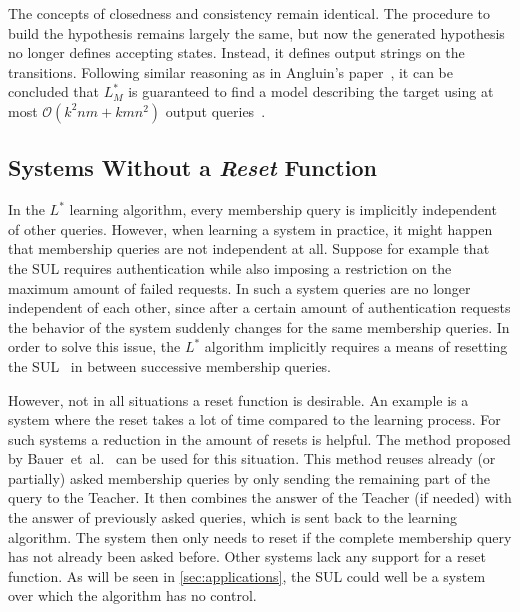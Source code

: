The concepts of closedness and consistency remain identical. The procedure to
build the hypothesis remains largely the same, but now the generated hypothesis
no longer defines accepting states. Instead, it defines output strings on the
transitions. Following similar reasoning as in Angluin's paper~\cite{Angluin1987}, it can be concluded that $L^*_M$ is guaranteed to find a
model describing the target using at most $\mathcal{O}(k^2nm + kmn^2)$ output
queries~\cite{Shahbaz2009}.

\subsection{Systems Without a \textit{Reset} Function}
\label{sec:noreset}
In the $L^*$ learning algorithm, every membership query is implicitly
independent of other queries. However, when learning a system in practice, it
might happen that membership queries are not independent at all. Suppose for
example that the SUL requires authentication while also imposing a restriction
on the maximum amount of failed requests. In such a system queries are no longer
independent of each other, since after a certain amount of authentication
requests the behavior of the system suddenly changes for the same membership
queries. In order to solve this issue, the $L^*$ algorithm implicitly requires a
means of resetting the SUL~\cite[p. 301]{Rivest1993} in between successive
membership queries.

However, not in all situations a reset function is desirable. An example is a
system where the reset takes a lot of time compared to the learning process. For
such systems a reduction in the amount of resets is helpful. The method proposed
by Bauer~et~al.~\cite{Bauer2012} can be used for this situation. This method
reuses already (or partially) asked membership queries by only sending the
remaining part of the query to the Teacher. It then combines the answer of the
Teacher (if needed) with the answer of previously asked queries, which is sent
back to the learning algorithm. The system then only needs to reset if the
complete membership query has not already been asked before. Other systems lack
any support for a reset function. As will be seen in \cref{sec:applications},
the SUL could well be a system over which the algorithm has no control.


